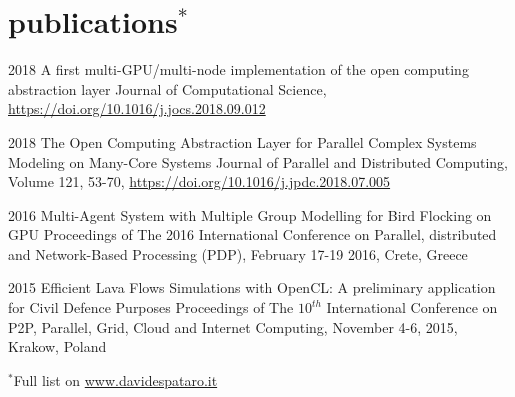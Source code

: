 \documentclass[]{twentysecondscv}
\begin{document}
\section{publications$^*$}
\footnotesize
\begin{twenty}
    \twentyitem
    {2018}
    {A first multi-GPU/multi-node implementation of the open computing abstraction layer}
    {}
    {\footnotesize{Journal of Computational Science, \url{https://doi.org/10.1016/j.jocs.2018.09.012}}}

    \twentyitem
    {2018}
    {The Open Computing Abstraction Layer for Parallel Complex Systems Modeling on Many-Core Systems}
    {}
    {\footnotesize{Journal of Parallel and Distributed Computing, Volume 121, 53-70, \url{https://doi.org/10.1016/j.jpdc.2018.07.005}}} 
    
    \twentyitem
    {2016}
    {Multi-Agent System with Multiple Group Modelling for Bird Flocking on GPU}
    {}
    {\footnotesize{Proceedings of The 2016 International Conference on Parallel, distributed and Network-Based Processing (PDP), February 17-19 2016, Crete, Greece}}
    
    
    \twentyitem
    {2015}
    {Efficient Lava Flows Simulations with OpenCL: A preliminary application for Civil Defence Purposes}
    {}
    {\footnotesize{Proceedings of The $10^{th}$ International Conference on P2P, Parallel, Grid, Cloud and Internet Computing, November 4-6, 2015, Krakow, Poland}}
%     

\end{twenty}
$^*$Full list on \url{www.davidespataro.it}


\end{document}
